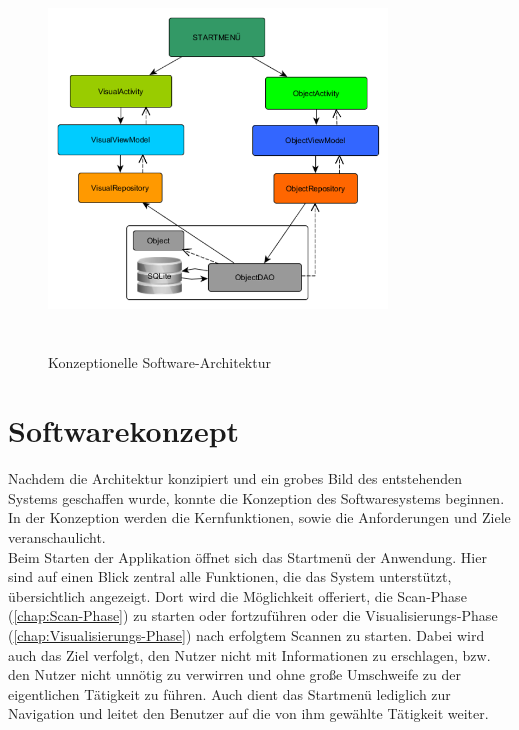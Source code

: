 \begin{figure}[hbt!]
    \centering
    \includegraphics[width=9cm,height=10cm,keepaspectratio]{3Konzeption/Bilder/architektur_konzept.png}
    \caption{Konzeptionelle Software-Architektur}
    \label{pic:architectur}
\end{figure}
\pagebreak
\section{Softwarekonzept}
\label{chap:Softwarekonzept}
Nachdem die Architektur konzipiert und ein grobes Bild des entstehenden Systems geschaffen wurde, konnte die Konzeption des 
Softwaresystems beginnen. In der Konzeption werden die Kernfunktionen, sowie die Anforderungen und Ziele veranschaulicht.
\\ 
\linebreak 
Beim Starten der Applikation öffnet sich das Startmenü der Anwendung. Hier sind auf einen Blick zentral alle Funktionen, die das System 
unterstützt, übersichtlich angezeigt. Dort wird die Möglichkeit offeriert, die Scan-Phase (\ref{chap:Scan-Phase}) zu starten oder fortzuführen 
oder die Visualisierungs-Phase (\ref{chap:Visualisierungs-Phase}) nach erfolgtem Scannen zu starten. Dabei wird auch das Ziel verfolgt, den 
Nutzer nicht mit Informationen zu erschlagen, bzw. den Nutzer nicht unnötig zu verwirren und ohne große Umschweife zu der eigentlichen Tätigkeit 
zu führen. Auch dient das Startmenü lediglich zur Navigation und leitet den Benutzer auf die von ihm gewählte Tätigkeit weiter.  

